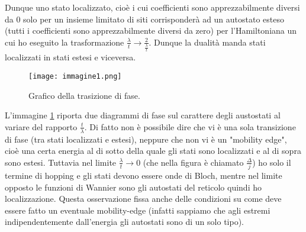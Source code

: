 \documentclass[10pt,a4paper]{article}
\begin{document}
Dunque uno stato localizzato, cioè i cui coefficienti sono apprezzabilmente diversi da 0 solo per un insieme limitato di siti corrisponderà ad un autostato esteso (tutti i coefficienti sono apprezzabilmente diversi da zero) per l'Hamiltoniana un cui ho eseguito la trasformazione $\frac{\lambda}{t}  \rightarrow  \frac{2}{\frac{\lambda}{t}}$. Dunque la dualità manda stati localizzati in stati estesi e viceversa.

\begin{figure}[!htb]
\centering
\texttt{[image: immagine1.png]}
\caption{Grafico della trasizione di fase.\label{fasi}}
\end{figure}

L'immagine \ref{fasi} riporta due diagrammi di fase sul carattere degli austostati al variare del rapporto $\frac{t}{\lambda}$. Di fatto non è possibile dire che vi è una sola transizione di fase (tra stati localizzati e estesi), neppure che non vi è un "mobility edge", cioè una certa energia al di sotto della quale gli stati sono localizzati e al di sopra sono estesi. Tuttavia nel limite $\frac{\lambda}{t} \rightarrow 0$ (che nella figura è chiamato $\frac{\Delta}{j}$) ho solo il termine di hopping e gli stati devono essere onde di Bloch, mentre nel limite opposto le funzioni di Wannier sono gli autostati del reticolo quindi ho localizzazione. Questa osservazione fissa anche delle condizioni su come deve essere fatto un eventuale mobility-edge (infatti sappiamo che agli estremi indipendentemente dall'energia gli autostati sono di un solo tipo).
\end{document}
